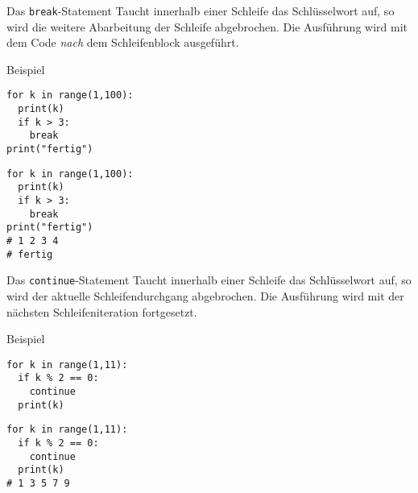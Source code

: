 \begin{fragile}
	

\begin{block}{Das \texttt{break}-Statement}
Taucht innerhalb einer Schleife das Schlüsselwort  auf, so wird die weitere Abarbeitung der Schleife abgebrochen. Die Ausführung wird mit dem Code \emph{nach} dem Schleifenblock ausgeführt. 		
\end{block}


\vspace{12pt} \pause 


\begin{exampleblock}{Beispiel}
\vspace{2pt}

\begin{overprint}
\begin{verbatim}
for k in range(1,100):
  print(k)
  if k > 3:
    break
print("fertig")
\end{verbatim}
\begin{verbatim}
for k in range(1,100):
  print(k)
  if k > 3:
    break
print("fertig")
# 1 2 3 4 
# fertig
\end{verbatim}
\end{overprint}

\end{exampleblock}

	
\end{fragile}



\begin{fragile}
	

\begin{block}{Das \texttt{continue}-Statement}
Taucht innerhalb einer Schleife das Schlüsselwort  auf, so wird der aktuelle Schleifendurchgang abgebrochen. Die Ausführung wird mit der nächsten Schleifeniteration fortgesetzt. 
\end{block}


\vspace{12pt} \pause 


\begin{exampleblock}{Beispiel}
\vspace{2pt}

\begin{overprint}
\begin{verbatim}
for k in range(1,11):
  if k % 2 == 0:
    continue
  print(k)
\end{verbatim}
\begin{verbatim}
for k in range(1,11):
  if k % 2 == 0:
    continue
  print(k)
# 1 3 5 7 9 
\end{verbatim}
\end{overprint}
\end{exampleblock}
	
	
\end{fragile}



